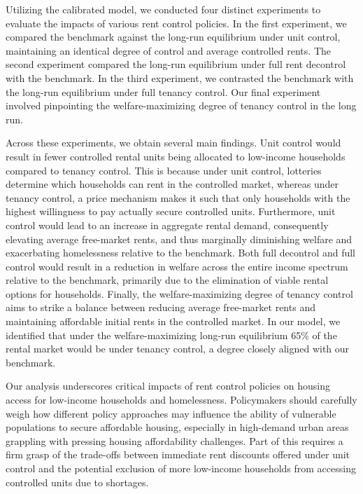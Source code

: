 \documentclass[parskip=full]{article}
\begin{document}
Utilizing the calibrated model, we conducted four distinct experiments to evaluate the impacts of various rent control policies. In the first experiment, we compared the benchmark against the long-run equilibrium under unit control, maintaining an identical degree of control and average controlled rents. The second experiment compared the long-run equilibrium under full rent decontrol with the benchmark. In the third experiment, we contrasted the benchmark with the long-run equilibrium under full tenancy control. Our final experiment involved pinpointing the welfare-maximizing degree of tenancy control in the long run.

Across these experiments, we obtain several main findings. Unit control would result in fewer controlled rental units being allocated to low-income households compared to tenancy control. This is because under unit control, lotteries determine which households can rent in the controlled market, whereas under tenancy control, a price mechanism makes it such that only households with the highest willingness to pay actually secure controlled units. Furthermore, unit control would lead to an increase in aggregate rental demand, consequently elevating average free-market rents, and thus marginally diminishing welfare and exacerbating homelessness relative to the benchmark. Both full decontrol and full control would result in a reduction in welfare across the entire income spectrum relative to the benchmark, primarily due to the elimination of viable rental options for households. Finally, the welfare-maximizing degree of tenancy control aims to strike a balance between reducing average free-market rents and maintaining affordable initial rents in the controlled market. In our model, we identified that under the welfare-maximizing long-run equilibrium 65\% of the rental market would be under tenancy control, a degree closely aligned with our benchmark.

Our analysis underscores critical impacts of rent control policies on housing access for low-income households and homelessness. Policymakers should carefully weigh how different policy approaches may influence the ability of vulnerable populations to secure affordable housing, especially in high-demand urban areas grappling with pressing housing affordability challenges. Part of this requires a firm grasp of the trade-offs between immediate rent discounts offered under unit control and the potential exclusion of more low-income households from accessing controlled units due to shortages.
\end{document}
